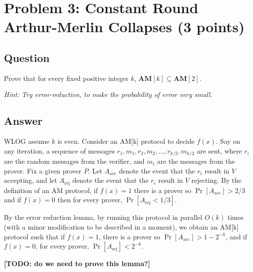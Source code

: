 \documentclass{article}
\newcommand{\BPP}{\mathbf{BPP}}
\newcommand{\AM}{\mathbf{AM}}
\begin{document}


\newpage
\section*{Problem 3: Constant Round Arthur-Merlin Collapses (3 points)}

\subsection*{Question}
Prove that for every fixed positive integer $k$, $\AM[k]\subseteq \AM[2]$.

\medskip

\emph{Hint: Try error-reduction, to make the probability of error very small.}


\subsection*{Answer}

WLOG assume $k$ is even. Consider an AM[k] protocol to decide $f(x)$.  Say on any iteration, a sequence of messages $r_1, m_1, r_2, m_2, \dots, r_{k/2}, m_{k/2}$ are sent, where $r_i$ are the random messages from the verifier, and $m_i$ are the messages from the prover.
Fix a given prover $P$.  Let $A_\text{acc}$ denote the event that the $r_i$ result in $V$ accepting, and let $A_\text{rej}$ denote the event that the $r_i$ result in $V$ rejecting.
By the definition of an AM protocol, if $f(x) = 1$ there is a prover so $\Pr[A_\text{acc}] > 2/3$ and if $f(x) = 0$ then for every prover, $\Pr[A_\text{rej} < 1/3]$.

By the error reduction lemma, by running this protocol in parallel $O(k)$ times (with a minor modification to be described in a moment), we obtain an AM[k] protocol such that if $f(x) = 1$, there is a prover so $\Pr[A_\text{acc}] > 1 - 2^{-k}$, and if $f(x) = 0$, for every prover, $\Pr[A_\text{rej}] < 2^{-k}$.

\textbf{[TODO: do we need to prove this lemma?]}
\end{document}
